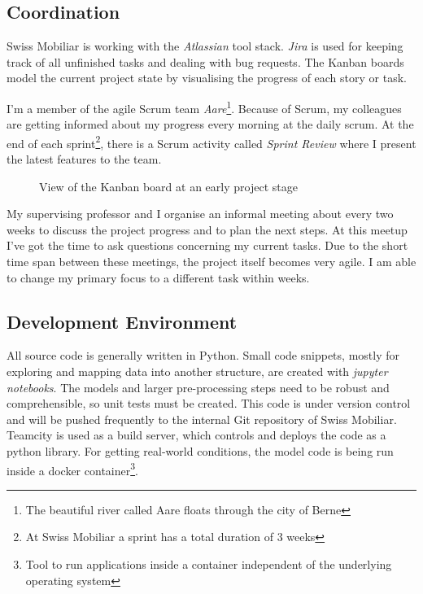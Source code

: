\subsection{Coordination}

Swiss Mobiliar is working with the \emph{Atlassian} tool stack. \emph{Jira} is used for keeping track of all unfinished tasks and
dealing with bug requests. The Kanban boards model the current project state by visualising the progress of each story or task.

I'm a member of the agile Scrum team \emph{Aare}\footnote{The beautiful river called Aare floats through the city of Berne}. Because of
Scrum, my colleagues are getting informed about my progress every morning at the daily scrum. At the end of each sprint\footnote{At
Swiss Mobiliar a sprint has a total duration of 3 weeks}, there is a Scrum activity called \emph{Sprint Review} where I present the
latest features to the team.

\begin{figure}[!ht]
\centering
{}
\caption{View of the Kanban board at an early project stage}
\label{fig:kanban}
\end{figure}

My supervising professor and I organise an informal meeting about every two weeks to discuss the project progress and to plan the
next steps. At this meetup I've got the time to ask questions concerning my current tasks. Due to the short time span between these
meetings, the project itself becomes very agile. I am able to change my primary focus to a different task within weeks.

\subsection{Development Environment}

All source code is generally written in Python. Small code snippets, mostly for exploring and mapping data into another structure,
are created with \emph{jupyter notebooks}. The models and larger pre-processing steps need to be robust and comprehensible, so
unit tests must be created. This code is under version control and will be pushed frequently to the internal Git repository of
Swiss Mobiliar. Teamcity is used as a build server, which controls and deploys the code as a python library. For getting real-world
conditions, the model code is being run inside a docker container\footnote{Tool to run applications inside a container independent
of the underlying operating system}.
